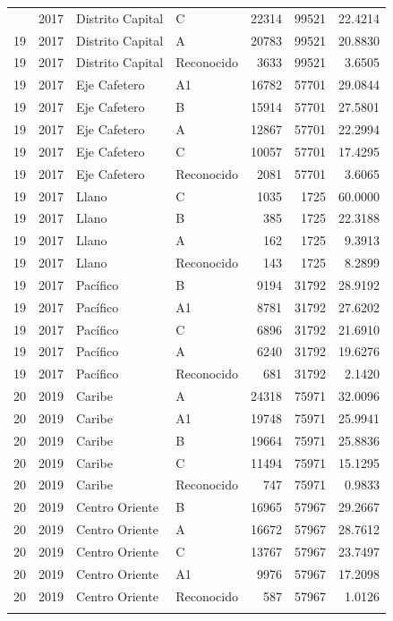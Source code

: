 \begin{longtable}{rrllrrr}
{{19 & 2017 & Distrito Capital & C & 22314 & 99521 & 22.4214 \\
19 & 2017 & Distrito Capital & A & 20783 & 99521 & 20.8830 \\
19 & 2017 & Distrito Capital & Reconocido & 3633 & 99521 & 3.6505 \\
19 & 2017 & Eje Cafetero & A1 & 16782 & 57701 & 29.0844 \\
19 & 2017 & Eje Cafetero & B & 15914 & 57701 & 27.5801 \\
19 & 2017 & Eje Cafetero & A & 12867 & 57701 & 22.2994 \\
19 & 2017 & Eje Cafetero & C & 10057 & 57701 & 17.4295 \\
19 & 2017 & Eje Cafetero & Reconocido & 2081 & 57701 & 3.6065 \\
19 & 2017 & Llano & C & 1035 & 1725 & 60.0000 \\
19 & 2017 & Llano & B & 385 & 1725 & 22.3188 \\
19 & 2017 & Llano & A & 162 & 1725 & 9.3913 \\
19 & 2017 & Llano & Reconocido & 143 & 1725 & 8.2899 \\
19 & 2017 & Pacífico & B & 9194 & 31792 & 28.9192 \\
19 & 2017 & Pacífico & A1 & 8781 & 31792 & 27.6202 \\
19 & 2017 & Pacífico & C & 6896 & 31792 & 21.6910 \\
19 & 2017 & Pacífico & A & 6240 & 31792 & 19.6276 \\
19 & 2017 & Pacífico & Reconocido & 681 & 31792 & 2.1420 \\
20 & 2019 & Caribe & A & 24318 & 75971 & 32.0096 \\
20 & 2019 & Caribe & A1 & 19748 & 75971 & 25.9941 \\
20 & 2019 & Caribe & B & 19664 & 75971 & 25.8836 \\
20 & 2019 & Caribe & C & 11494 & 75971 & 15.1295 \\
20 & 2019 & Caribe & Reconocido & 747 & 75971 & 0.9833 \\
20 & 2019 & Centro Oriente & B & 16965 & 57967 & 29.2667 \\
20 & 2019 & Centro Oriente & A & 16672 & 57967 & 28.7612 \\
20 & 2019 & Centro Oriente & C & 13767 & 57967 & 23.7497 \\
20 & 2019 & Centro Oriente & A1 & 9976 & 57967 & 17.2098 \\
20 & 2019 & Centro Oriente & Reconocido & 587 & 57967 & 1.0126 \\
}}
\end{longtable}
